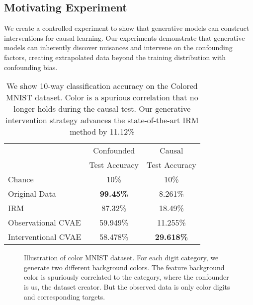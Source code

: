 \documentclass[final]{cvpr}
\begin{document}
\newpage
\newpage
\begin{subappendices}








\section{Motivating Experiment}

We create a controlled experiment to show that generative models can construct interventions for causal learning. Our experiments demonstrate that generative models can inherently discover nuisances and intervene on the confounding factors, creating extrapolated data beyond the training distribution with confounding bias.  

\begin{table}
\centering
    \centering
\small
    \begin{tabular}{l|c|c}
         \toprule
         & Confounded & Causal \\
         & Test Accuracy  &  Test Accuracy\\
         \midrule  
         Chance & 10\% & 10\%  \\
         Original Data  & \textbf{99.45\%} & 8.261\%  \\
         IRM \cite{arjovsky2019invariant} & 87.32\% & 18.49\% \\
         Observational CVAE \cite{CVAE} & 59.949\%& 11.255\%\\
         Interventional CVAE & 58.478\%& \textbf{29.618\%}  \\
\bottomrule
    \end{tabular}
\caption{We show 10-way classification accuracy on the Colored MNIST dataset. Color is a spurious correlation that no longer holds during the causal test. Our generative intervention strategy advances the state-of-the-art IRM method by 11.12\%} \label{tab:colorfulmnist}
\end{table}


\begin{figure}
  \centering
  \hspace{5em}
  \caption{Illustration of color MNIST dataset. For each digit category, we generate two different background colors. The feature background color is spuriously correlated to the category, where the confounder is us, the dataset creator. But the observed data is only color digits and corresponding targets.
}
  \label{fig:train-color}
\end{figure}







\end{subappendices}
\end{document}
